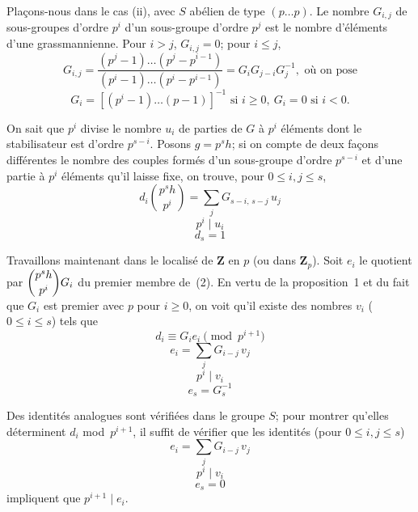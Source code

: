 \documentclass[12pt]{amsart}
\theoremstyle{plain}
\begin{document}
Plaçons-nous dans le cas (ii), avec $S$ abélien de type $(p\dots p)$. Le nombre $G_{i,j}$ de sous-groupes d'ordre $p^i$ d'un sous-groupe d'ordre $p^j$ est le nombre d'éléments d'une grassmannienne. Pour $i > j$, $G_{i,j} = 0$; pour $i \leqslant j$,
\[
G_{i,j} = \frac{(p^j-1)\dots(p^j-p^{i-1})}{(p^i-1)\dots(p^i-p^{i-1})} = G_i G_{j-i} G_j^{-1}, \text{ où on pose}
\]
\[
G_i = [(p^i-1)\dots(p-1)]^{-1} \text{ si } i \geqslant 0,\ G_i = 0 \text{ si } i < 0.
\]

On sait que $p^i$ divise le nombre $u_i$ de parties de $G$ à $p^i$ éléments dont le stabilisateur est d'ordre $p^{s-i}$. Posons $g = p^s h$; si on compte de deux façons différentes le nombre des couples formés d'un sous-groupe d'ordre $p^{s-i}$ et d'une partie à $p^i$ éléments qu'il laisse fixe, on trouve, pour $0 \leqslant i,j \leqslant s$,
\begin{equation}
d_i \binom{p^s h}{p^i} = \sum_j G_{s-i,\,s-j}\, u_j
\end{equation}
\begin{equation}
p^i \mid u_i
\end{equation}
\begin{equation}
d_s = 1
\end{equation}

Travaillons maintenant dans le localisé de $\mathbf{Z}$ en $p$ (ou dans $\mathbf{Z}_p$). Soit $e_i$ le quotient par $\dbinom{p^s h}{p^i} G_i$ du premier membre de~(2). En vertu de la proposition~1 et du fait que $G_i$ est premier avec $p$ pour $i \geqslant 0$, on voit qu'il existe des nombres $v_i$ ($0 \leqslant i \leqslant s$) tels que
\begin{equation}
d_i \equiv G_i e_i \pmod{p^{i+1}}
\end{equation}
\begin{equation}
e_i = \sum_j G_{i-j}\, v_j
\tag{$2'$}
\end{equation}
\begin{equation}
p^i \mid v_i
\end{equation}
\begin{equation}
e_s = G_s^{-1}
\end{equation}

Des identités analogues sont vérifiées dans le groupe $S$; pour montrer qu'elles déterminent $d_i$ mod~$p^{i+1}$, il suffit de vérifier que les identités (pour $0 \leqslant i,j \leqslant s$)
\begin{equation}
e_i = \sum_j G_{i-j}\, v_j
\end{equation}
\begin{equation}
p^i \mid v_i
\end{equation}
\begin{equation}
e_s = 0
\end{equation}
impliquent que $p^{i+1} \mid e_i$.
\end{document}
